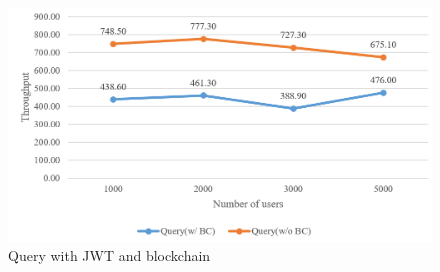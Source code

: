 \begin{figure}[htb]
    \centering
    \includegraphics[height=!,width=1\linewidth,keepaspectratio=true]{figures/query.png}
    \caption{{\footnotesize Query with JWT and blockchain}}
    \label{fig:query}
\end{figure}